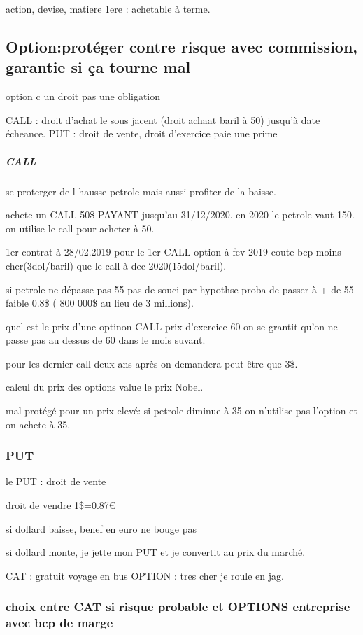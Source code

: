 \documentclass[a4paper,12pt]{article}
\begin{document}
action, devise, matiere 1ere : achetable à terme.

  
\subsection{ Option:protéger contre risque avec commission, garantie si ça tourne mal}
  
 option c un droit pas une obligation
 
 CALL : droit d'achat le sous jacent (droit achaat baril à 50) jusqu'à date écheance.
 PUT : droit de vente, 
 droit d'exercice
 paie une prime
 
 \subparagraph{CALL}
 
 se proterger de l hausse petrole mais aussi profiter de la baisse.
 
 achete un CALL 50\$   PAYANT  jusqu'au 31/12/2020.
 en 2020 le petrole vaut 150. on utilise le call pour acheter à 50.
 
 1er contrat à 28/02.2019 pour le 1er CALL option à fev 2019 coute bcp moins cher(3dol/baril) que le call à dec 2020(15dol/baril).
 
 si petrole ne dépasse pas 55 pas de souci par hypothse proba de passer à + de 55 faible 0.8\$ ( 800 000\$ au lieu de 3 millions).
 
 quel est le prix d'une optinon CALL prix d'exercice 60 on se grantit qu'on ne passe pas au dessus de 60 dans le mois suvant.
 
 pour les dernier call deux ans après  on demandera peut être que 3\$.
 
 
 calcul du prix des options value le prix Nobel.
 
 mal protégé pour un prix elevé: si petrole diminue à 35 on n'utilise pas l'option et on achete à 35.
 
 
 \subsubsection{PUT}
 le PUT : droit de vente
 
 
 droit de vendre 1\$=0.87€
 
 si dollard baisse, benef en euro ne bouge pas
 
 si dollard monte, je jette mon PUT et je convertit au prix du marché.
 
 
 CAT : gratuit voyage en bus
 OPTION : tres cher je roule en jag.
 
 
 \subsubsection{choix entre CAT si risque probable et OPTIONS entreprise avec bcp de marge}
\end{document}
